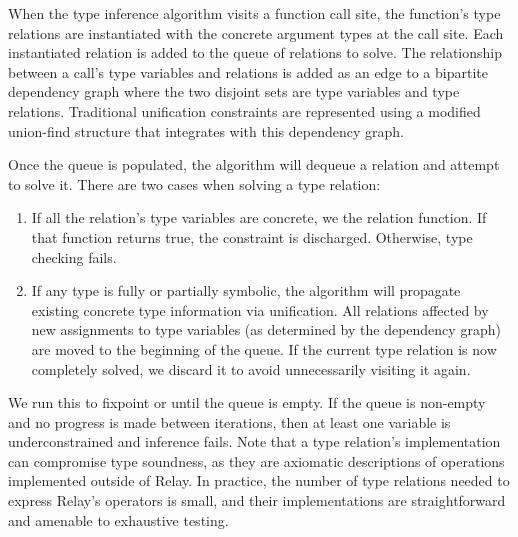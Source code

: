 
    When the type inference algorithm visits a function call site, the function's type relations are
      instantiated with the concrete argument types at the call site.
    Each instantiated relation is added to the queue of relations to solve.
    The relationship between a call's type variables and relations is added as an edge to
      a bipartite dependency graph where the two disjoint sets are type variables and type relations.
    Traditional unification constraints are represented using a modified union-find structure that
      integrates with this dependency graph.

    Once the queue is populated, the algorithm will dequeue a relation and attempt to solve it.
    There are two cases when solving a type relation:
    \begin{enumerate}
      \item If all the relation's type variables
      are concrete, we the relation function. If that function returns true, the
      constraint is discharged. Otherwise, type checking fails.
      \item If any type is fully or partially symbolic, the
        algorithm will propagate
        existing concrete type information via unification.
      All relations affected by new assignments to type
        variables (as determined by the dependency graph)
        are moved to the beginning of the queue.
      If the current type relation is now completely solved, we
      discard it to avoid unnecessarily visiting it again.
    \end{enumerate}

    We run this to fixpoint or until the queue is empty.
    If the queue is non-empty and no progress is made between iterations,
      then at least one variable is underconstrained and inference fails.
    Note that a type relation's implementation can
      compromise type soundness, as they are axiomatic descriptions
      of operations implemented outside of Relay.
    In practice, the number of type relations needed to express Relay's
      operators is small, and their implementations are straightforward
      and amenable to exhaustive testing.

